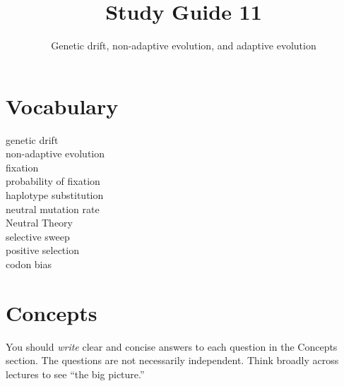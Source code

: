 \documentclass[letterpaper]{tufte-handout}
\title{Study Guide 11\hfill}
\author{Genetic drift, non-adaptive evolution, and adaptive evolution}
\date{} %
\begin{document}
\maketitle	%

\section{Vocabulary}

\begin{multicols}{2}
genetic drift \\
non-adaptive evolution \\
fixation \\
probability of fixation \\
haplotype substitution \\
neutral mutation rate \\
Neutral Theory \\
selective sweep \\
positive selection \\
codon bias
\end{multicols}


\section{Concepts}

You should \emph{write} clear and concise answers to each question in the Concepts section.  The questions are not necessarily independent.  Think broadly across lectures to see ``the big picture.'' 
\end{document}
